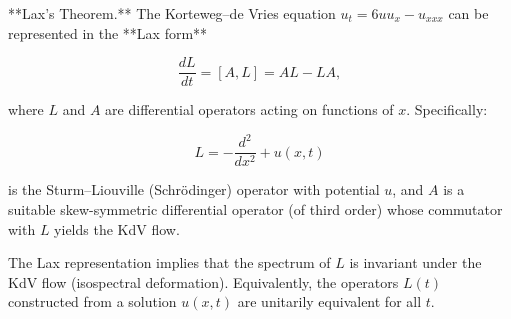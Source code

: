 **Lax's Theorem.** The Korteweg–de Vries equation $u_t = 6uu_x - u_{xxx}$ can be represented in the **Lax form**

$$\frac{dL}{dt} = [A, L] = AL - LA,$$

where $L$ and $A$ are differential operators acting on functions of $x$. Specifically:

$$L = -\frac{d^2}{dx^2} + u(x, t)$$

is the Sturm–Liouville (Schrödinger) operator with potential $u$, and $A$ is a suitable skew-symmetric differential operator (of third order) whose commutator with $L$ yields the KdV flow.

The Lax representation implies that the spectrum of $L$ is invariant under the KdV flow (isospectral deformation). Equivalently, the operators $L(t)$ constructed from a solution $u(x, t)$ are unitarily equivalent for all $t$.
